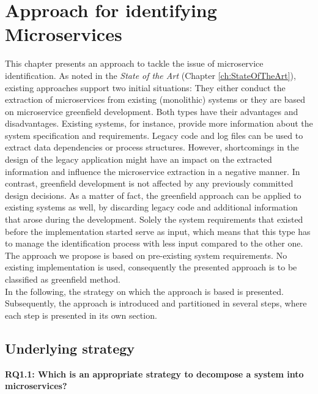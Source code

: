 \chapter{Approach for identifying Microservices}
\label{ch:Solution}
This chapter presents an approach to tackle the issue of microservice identification. 
As noted in the \textit{State of the Art} (Chapter \ref{ch:StateOfTheArt}), existing approaches support two initial situations: They either conduct the extraction of microservices from existing (monolithic) systems or they are based on microservice greenfield development. Both types have their advantages and disadvantages. Existing systems, for instance, provide more information about the system specification and requirements. Legacy code and log files can be used to extract data dependencies or process structures. However, shortcomings in the design of the legacy application might have an impact on the extracted information and influence the microservice extraction in a negative manner. In contrast, greenfield development is not affected by any previously committed design decisions. As a matter of fact, the greenfield approach can be applied to existing systems as well, by discarding legacy code and additional information that arose during the development. Solely the system requirements that existed before the implementation started serve as input, which means that this type has to manage the identification process with less input compared to the other one.\\
The approach we propose is based on pre-existing system requirements. No existing implementation is used, consequently the presented approach is to be classified as greenfield method.\\
In the following, the strategy on which the approach is based is presented. Subsequently, the approach is introduced and partitioned in several steps, where each step is presented in its own section.



\section{Underlying strategy}


\vspace{0.5cm}
\par
\begingroup
\leftskip=1cm
\rightskip=1cm

\noindent
\textbf{RQ1.1: Which is an appropriate strategy to decompose a system into microservices? }

